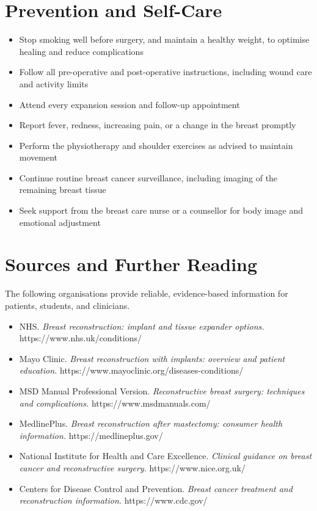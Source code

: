\section*{Prevention and Self-Care}
\begin{itemize}
    \item Stop smoking well before surgery, and maintain a healthy weight, to optimise healing and reduce complications
    \item Follow all pre-operative and post-operative instructions, including wound care and activity limits
    \item Attend every expansion session and follow-up appointment
    \item Report fever, redness, increasing pain, or a change in the breast promptly
    \item Perform the physiotherapy and shoulder exercises as advised to maintain movement
    \item Continue routine breast cancer surveillance, including imaging of the remaining breast tissue
    \item Seek support from the breast care nurse or a counsellor for body image and emotional adjustment
\end{itemize}

\section*{Sources and Further Reading}
The following organisations provide reliable, evidence-based information for patients, students, and clinicians.

\begin{itemize}
    \item NHS. \textit{Breast reconstruction: implant and tissue expander options.} https://www.nhs.uk/conditions/
    \item Mayo Clinic. \textit{Breast reconstruction with implants: overview and patient education.} https://www.mayoclinic.org/diseases-conditions/
    \item MSD Manual Professional Version. \textit{Reconstructive breast surgery: techniques and complications.} https://www.msdmanuals.com/
    \item MedlinePlus. \textit{Breast reconstruction after mastectomy: consumer health information.} https://medlineplus.gov/
    \item National Institute for Health and Care Excellence. \textit{Clinical guidance on breast cancer and reconstructive surgery.} https://www.nice.org.uk/
    \item Centers for Disease Control and Prevention. \textit{Breast cancer treatment and reconstruction information.} https://www.cdc.gov/
\end{itemize}

